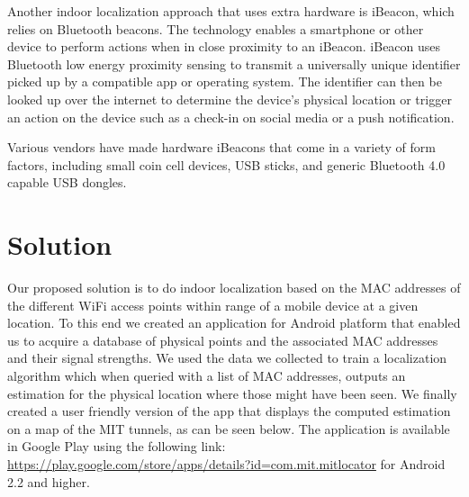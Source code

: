 \documentclass[11pt]{article}
\begin{document}
Another indoor localization approach that uses extra hardware is iBeacon, which relies on Bluetooth beacons. The technology enables a smartphone or other device to perform actions when in close proximity to an iBeacon. iBeacon uses Bluetooth low energy proximity sensing to transmit a universally unique identifier picked up by a compatible app or operating system. The identifier can then be looked up over the internet to determine the device's physical location or trigger an action on the device such as a check-in on social media or a push notification.

Various vendors have made hardware iBeacons that come in a variety of form factors, including small coin cell devices, USB sticks, and generic Bluetooth 4.0 capable USB dongles.\cite{iBeacons}

\section{Solution}
Our proposed solution is to do indoor localization based on the MAC addresses of the different WiFi access points within range of a mobile device at a given location. To this end we created an application for Android platform that enabled us to acquire a database of physical points and the associated MAC addresses and their signal strengths. We used the data we collected to train a localization algorithm which when queried with a list of MAC addresses, outputs an estimation for the physical location where those might have been seen. We finally created a user friendly version of the app that displays the computed estimation on a map of the MIT tunnels, as can be seen below. The application is available in Google Play using the following link: \url{https://play.google.com/store/apps/details?id=com.mit.mitlocator} for Android 2.2 and higher.
\end{document}
